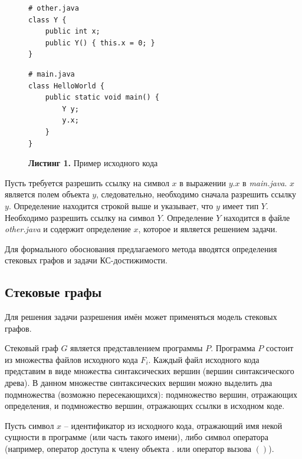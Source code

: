 \begin{figure}[htb]
\centering
\begin{minipage}[t]{0.44\textwidth}
\begin{Verbatim}[fontsize=\small]
# other.java
class Y {
    public int x;
    public Y() { this.x = 0; }
}
\end{Verbatim}
\end{minipage}
\hfill
\begin{minipage}[t]{0.50\textwidth}
\begin{Verbatim}[fontsize=\small]
# main.java
class HelloWorld {
    public static void main() {
        Y y;
        y.x;
    }
}
\end{Verbatim}
\end{minipage}
\caption*{\textbf{Листинг 1.} Пример исходного кода}
\label{lst:java-example}
\end{figure}

Пусть требуется разрешить ссылку на символ \(x\) в выражении \(y.x\) в \emph{main.java}. \(x\) является полем объекта \(y\), следовательно, необходимо сначала разрешить ссылку \(y\). Определение находится строкой выше и указывает, что \(y\) имеет тип \(Y\). Необходимо разрешить ссылку на символ \(Y\). Определение \(Y\) находится в файле \emph{other.java} и содержит определение \(x\), которое и является решением задачи.

Для формального обоснования предлагаемого метода вводятся определения стековых графов и задачи КС-достижимости.

\subsection{Стековые графы}\label{sec:stack-graphs}

Для решения задачи разрешения имён может применяться модель стековых графов.

Стековый граф \(G\) является представлением программы \(P\). Программа \(P\) состоит из множества файлов исходного кода \(F_{i}\). Каждый файл исходного кода представим в виде множества синтаксических вершин (вершин синтаксического древа). В данном множестве синтаксических вершин можно выделить два подмножества (возможно пересекающихся): подмножество вершин, отражающих определения, и подмножество вершин, отражающих ссылки в исходном коде.

Пусть символ \(x\) -- идентификатор из исходного кода, отражающий имя некой сущности в программе (или часть такого имени), либо символ оператора (например, оператор доступа к члену объекта \(.\) или оператор вызова \(()\)).

